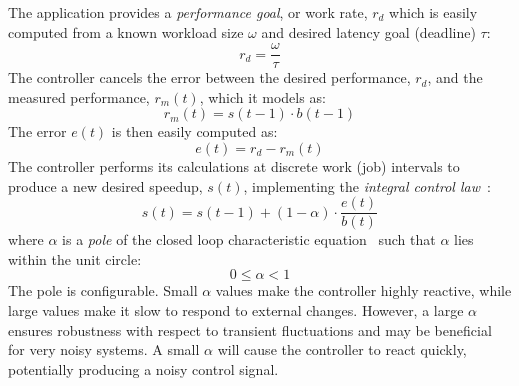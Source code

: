 The application provides a \emph{performance goal}, or work rate, $r_d$ which is easily computed from a known workload size $\omega$ and desired latency goal (deadline) $\tau$:
\begin{equation}
  r_d = \frac{\omega}{\tau}
  \label{eqn:poet-latency-to-performance}
\end{equation}
The controller cancels the error between the desired performance, $r_d$, and the measured performance, $r_m(t)$, which it models as:
\begin{equation}
r_m(t) = s(t-1) \cdot b(t-1)
\label{eqn:poet-performance}
\end{equation}
The error $e(t)$ is then easily computed as:
\begin{equation}
e(t) = r_d - r_m(t)
\label{eqn:poet-error}
\end{equation}
The controller performs its calculations at discrete work (job) intervals to produce a new desired speedup, $s(t)$, implementing the \emph{integral control law}~\cite{Hellerstein2004a}:
\begin{equation}
  s(t) = s(t-1) + (1-\alpha) \cdot \frac{e(t)}{b(t)}
  \label{eqn:poet-control}
\end{equation}
where $\alpha$ is a \emph{pole} of the closed loop characteristic equation~\cite{ICSE2014} such that $\alpha$ lies within the unit circle:
\begin{equation}
  0 \le \alpha < 1
  \label{eqn:pole}
\end{equation}
The pole is configurable.
Small $\alpha$ values make the controller highly reactive, while large values make it slow to respond to external changes.
However, a large $\alpha$ ensures robustness with respect to transient fluctuations and may be beneficial for very noisy systems.
A small $\alpha$ will cause the controller to react quickly, potentially producing a noisy control signal.

